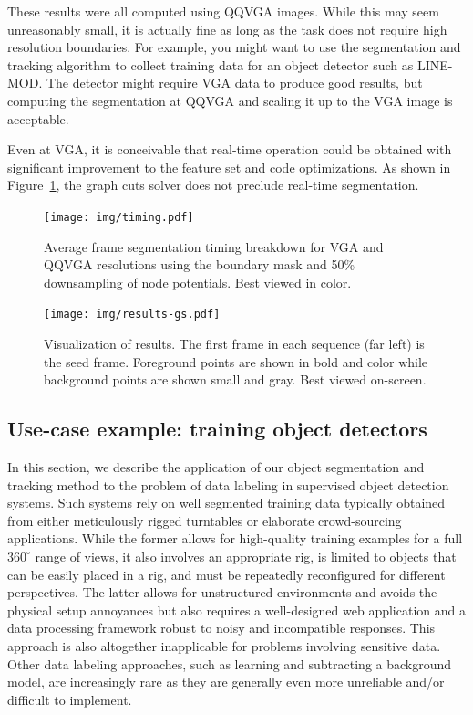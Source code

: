 \documentclass[graybox]{svmult}
\newcommand{\vga}{VGA\xspace}
\newcommand{\qqvga}{QQVGA\xspace}
\begin{document}
These results were all computed using \qqvga images.  While this may seem unreasonably small, it is actually fine as long as the task does not require high resolution boundaries.  For example, you might want to use the segmentation and tracking algorithm to collect training data for an object detector such as LINE-MOD.  The detector might require \vga data to produce good results, but computing the segmentation at \qqvga and scaling it up to the \vga image is acceptable.

Even at \vga, it is conceivable that real-time operation could be obtained with significant improvement to the feature set and code optimizations.  As shown in Figure~\ref{fig:timing}, the graph cuts solver does not preclude real-time segmentation.

\begin{figure}
  \centering
  \texttt{[image: img/timing.pdf]}
  \caption{Average frame segmentation timing breakdown for \vga and \qqvga resolutions using the boundary mask and 50\% downsampling of node potentials.  Best viewed in color.}
  \label{fig:timing}
\end{figure}


\begin{figure}
  \centering
  \vspace{1cm}
  \texttt{[image: img/results-gs.pdf]}
  \caption{Visualization of results.  The first frame in each sequence (far left) is the seed frame.  Foreground points are shown in bold and color while background points are shown small and gray. Best viewed on-screen.}
  \label{fig:results}
  \vspace{50pt}
\end{figure}

\subsection{Use-case example: training object detectors}
\label{sec:example}

In this section, we describe the application of our object segmentation and tracking method to the problem of data labeling in supervised object detection systems. Such systems rely on well segmented training data typically obtained from either meticulously rigged turntables or elaborate crowd-sourcing applications.  While the former allows for high-quality training examples for a full $360^{\circ}$ range of views, it also involves an appropriate rig, is limited to objects that can be easily placed in a rig, and must be repeatedly reconfigured for different perspectives.  The latter allows for unstructured environments and avoids the physical setup annoyances but also requires a well-designed web application and a data processing framework robust to noisy and incompatible responses. This approach is also altogether inapplicable for problems involving sensitive data.  Other data labeling approaches, such as learning and subtracting a background model, are increasingly rare as they are generally even more unreliable and/or difficult to implement.
\end{document}
